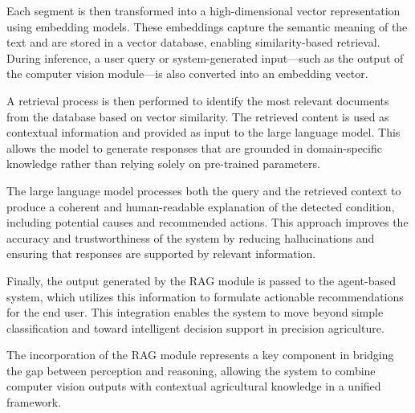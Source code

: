 \documentclass[11pt]{article}
\begin{document}
Each segment is then transformed into a high-dimensional vector representation using embedding models. These embeddings capture the semantic meaning of the text and are stored in a vector database, enabling similarity-based retrieval. During inference, a user query or system-generated input—such as the output of the computer vision module—is also converted into an embedding vector.

A retrieval process is then performed to identify the most relevant documents from the database based on vector similarity. The retrieved content is used as contextual information and provided as input to the large language model. This allows the model to generate responses that are grounded in domain-specific knowledge rather than relying solely on pre-trained parameters.

The large language model processes both the query and the retrieved context to produce a coherent and human-readable explanation of the detected condition, including potential causes and recommended actions. This approach improves the accuracy and trustworthiness of the system by reducing hallucinations and ensuring that responses are supported by relevant information.

Finally, the output generated by the RAG module is passed to the agent-based system, which utilizes this information to formulate actionable recommendations for the end user. This integration enables the system to move beyond simple classification and toward intelligent decision support in precision agriculture.

The incorporation of the RAG module represents a key component in bridging the gap between perception and reasoning, allowing the system to combine computer vision outputs with contextual agricultural knowledge in a unified framework.
\end{document}

